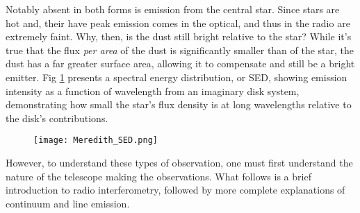 Notably absent in both forms is emission from the central star. Since stars are hot and, their have peak emission comes in the optical, and thus in the radio are extremely faint. Why, then, is the dust still bright relative to the star? While it's true that the flux \textit{per area} of the dust is significantly smaller than of the star, the dust has a far greater surface area, allowing it to compensate and still be a bright emitter. Fig \ref{fig:SED} \citep{Hughes2010} presents a spectral energy distribution, or SED, showing emission intensity as a function of wavelength from an imaginary disk system, demonstrating how small the star's flux density is at long wavelengths relative to the disk's contributions.


\begin{figure}
\centering
  \texttt{[image: Meredith\_SED.png]}
  \label{fig:SED}
\end{figure}


However, to understand these types of observation, one must first understand the nature of the telescope making the observations. What follows is a brief introduction to radio interferometry, followed by more complete explanations of continuum and line emission.



